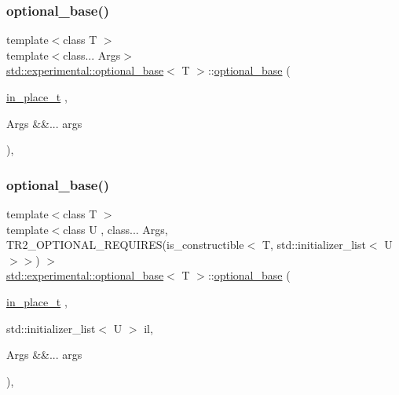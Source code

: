 \subsubsection{\texorpdfstring{optional\+\_\+base()}{optional\_base()}\hspace{0.1cm}{\footnotesize\ttfamily [4/5]}}
{\footnotesize\ttfamily template$<$class T $>$ \\
template$<$class... Args$>$ \\
\hyperlink{structstd_1_1experimental_1_1optional__base}{std\+::experimental\+::optional\+\_\+base}$<$ T $>$\+::\hyperlink{structstd_1_1experimental_1_1optional__base}{optional\+\_\+base} (\begin{DoxyParamCaption}\item[{\hyperlink{structstd_1_1experimental_1_1in__place__t}{in\+\_\+place\+\_\+t}}]{,  }\item[{Args \&\&...}]{args }\end{DoxyParamCaption})\hspace{0.3cm}{\ttfamily [inline]}, {\ttfamily [explicit]}}

\mbox{\label{structstd_1_1experimental_1_1optional__base_ae63b6e3b01c36339007f52f4069c1f4f}} 
\subsubsection{\texorpdfstring{optional\+\_\+base()}{optional\_base()}\hspace{0.1cm}{\footnotesize\ttfamily [5/5]}}
{\footnotesize\ttfamily template$<$class T $>$ \\
template$<$class U , class... Args, T\+R2\+\_\+\+O\+P\+T\+I\+O\+N\+A\+L\+\_\+\+R\+E\+Q\+U\+I\+R\+E\+S(is\+\_\+constructible$<$ T, std\+::initializer\+\_\+list$<$ U $>$$>$) $>$ \\
\hyperlink{structstd_1_1experimental_1_1optional__base}{std\+::experimental\+::optional\+\_\+base}$<$ T $>$\+::\hyperlink{structstd_1_1experimental_1_1optional__base}{optional\+\_\+base} (\begin{DoxyParamCaption}\item[{\hyperlink{structstd_1_1experimental_1_1in__place__t}{in\+\_\+place\+\_\+t}}]{,  }\item[{std\+::initializer\+\_\+list$<$ U $>$}]{il,  }\item[{Args \&\&...}]{args }\end{DoxyParamCaption})\hspace{0.3cm}{\ttfamily [inline]}, {\ttfamily [explicit]}}

